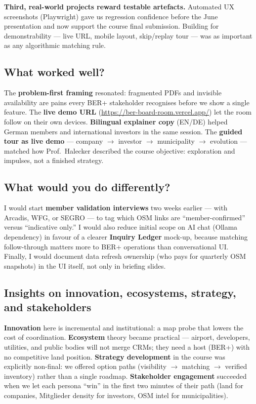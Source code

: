 \documentclass[11pt,a4paper]{article}
\begin{document}
\textbf{Third, real-world projects reward testable artefacts.} Automated UX screenshots (Playwright) gave us regression confidence before the June presentation and now support the course final submission. Building for demonstrability — live URL, mobile layout, skip/replay tour — was as important as any algorithmic matching rule.

\subsection*{What worked well?}
The \textbf{problem-first framing} resonated: fragmented PDFs and invisible availability are pains every BER+ stakeholder recognises before we show a single feature. The \textbf{live demo URL} (\url{https://ber-board-room.vercel.app/}) let the room follow on their own devices. \textbf{Bilingual explainer copy} (EN/DE) helped German members and international investors in the same session. The \textbf{guided tour as live demo} — company $\rightarrow$ investor $\rightarrow$ municipality $\rightarrow$ evolution — matched how Prof.\ Halecker described the course objective: exploration and impulses, not a finished strategy.

\subsection*{What would you do differently?}
I would start \textbf{member validation interviews} two weeks earlier — with Arcadis, WFG, or SEGRO — to tag which OSM links are ``member-confirmed'' versus ``indicative only.'' I would also reduce initial scope on AI chat (Ollama dependency) in favour of a clearer \textbf{Inquiry Ledger} mock-up, because matching follow-through matters more to BER+ operations than conversational UI. Finally, I would document data refresh ownership (who pays for quarterly OSM snapshots) in the UI itself, not only in briefing slides.

\subsection*{Insights on innovation, ecosystems, strategy, and stakeholders}
\textbf{Innovation} here is incremental and institutional: a map probe that lowers the cost of coordination. \textbf{Ecosystem} theory became practical — airport, developers, utilities, and public bodies will not merge CRMs; they need a host (BER+) with no competitive land position. \textbf{Strategy development} in the course was explicitly non-final: we offered option paths (visibility $\rightarrow$ matching $\rightarrow$ verified inventory) rather than a single roadmap. \textbf{Stakeholder engagement} succeeded when we let each persona ``win'' in the first two minutes of their path (land for companies, Mitglieder density for investors, OSM intel for municipalities).
\end{document}
